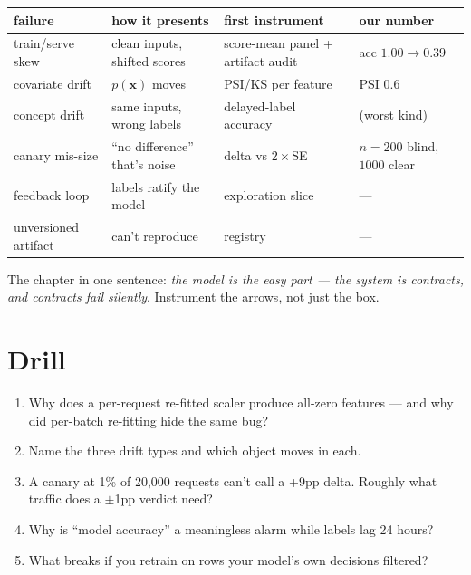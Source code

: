 \begin{center}\small
\begin{tabular}{p{3.2cm}p{4.4cm}p{3.2cm}p{2.6cm}}
\toprule
failure & how it presents & first instrument & our number \\
\midrule
train/serve skew & clean inputs, shifted scores & score-mean panel + artifact audit & acc $1.00\to0.39$ \\
covariate drift & $p(\mathbf x)$ moves & PSI/KS per feature & PSI $0.6$ \\
concept drift & same inputs, wrong labels & delayed-label accuracy & (worst kind) \\
canary mis-size & ``no difference'' that's noise & delta vs $2\times$SE & $n{=}200$ blind, $1000$ clear \\
feedback loop & labels ratify the model & exploration slice & --- \\
unversioned artifact & can't reproduce & registry & --- \\
\bottomrule
\end{tabular}
\end{center}

The chapter in one sentence: \emph{the model is the easy part ---
the system is contracts, and contracts fail silently}. Instrument the
arrows, not just the box.

\section*{Drill}
\begin{enumerate}
\item Why does a per-request re-fitted scaler produce all-zero
features --- and why did per-batch re-fitting hide the same bug?
\item Name the three drift types and which object moves in each.
\item A canary at 1\% of 20{,}000 requests can't call a +9pp delta.
Roughly what traffic does a $\pm$1pp verdict need?
\item Why is ``model accuracy'' a meaningless alarm while labels lag
24 hours?
\item What breaks if you retrain on rows your model's own decisions
filtered?
\end{enumerate}

